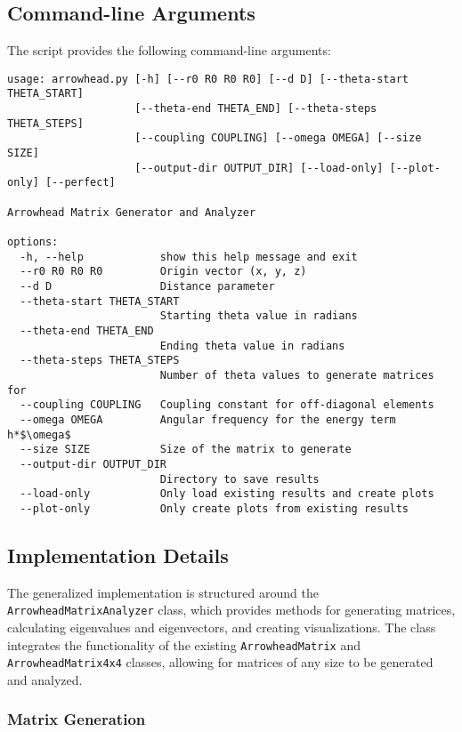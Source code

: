 \subsection{Command-line Arguments}

The script provides the following command-line arguments:

\begin{verbatim}
usage: arrowhead.py [-h] [--r0 R0 R0 R0] [--d D] [--theta-start THETA_START]
                    [--theta-end THETA_END] [--theta-steps THETA_STEPS]
                    [--coupling COUPLING] [--omega OMEGA] [--size SIZE]
                    [--output-dir OUTPUT_DIR] [--load-only] [--plot-only] [--perfect]

Arrowhead Matrix Generator and Analyzer

options:
  -h, --help            show this help message and exit
  --r0 R0 R0 R0         Origin vector (x, y, z)
  --d D                 Distance parameter
  --theta-start THETA_START
                        Starting theta value in radians
  --theta-end THETA_END
                        Ending theta value in radians
  --theta-steps THETA_STEPS
                        Number of theta values to generate matrices for
  --coupling COUPLING   Coupling constant for off-diagonal elements
  --omega OMEGA         Angular frequency for the energy term h*$\omega$
  --size SIZE           Size of the matrix to generate
  --output-dir OUTPUT_DIR
                        Directory to save results
  --load-only           Only load existing results and create plots
  --plot-only           Only create plots from existing results
\end{verbatim}

\subsection{Implementation Details}

The generalized implementation is structured around the \texttt{ArrowheadMatrixAnalyzer} class, which provides methods for generating matrices, calculating eigenvalues and eigenvectors, and creating visualizations. The class integrates the functionality of the existing \texttt{ArrowheadMatrix} and \texttt{ArrowheadMatrix4x4} classes, allowing for matrices of any size to be generated and analyzed.

\subsubsection{Matrix Generation}

